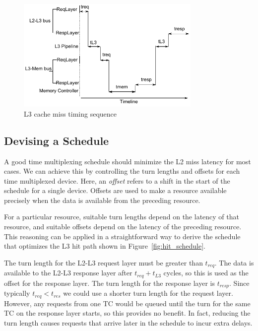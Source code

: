 \begin{figure}
    \begin{center}
        \includegraphics[width=3.5in]{figs/miss_timing.pdf}
        \caption{L3 cache miss timing sequence}
        \label{fig:miss_timing}
    \end{center}
\end{figure}

\subsection{Devising a Schedule}
A good time multiplexing schedule should minimize the L2 miss latency for most 
cases. We can achieve this by controlling the turn lengths and offsets for each 
time multiplexed device. Here, an \emph{offset} refers to a shift in the start 
of the schedule for a single device. Offsets are used to make a resource 
available precisely when the data is available from the preceding resource.


For a particular resource, suitable turn lengths depend on the latency of that 
resource, and suitable offsets depend on the latency of the preceding resource.
This reasoning can be applied in a straightforward way to derive the schedule 
that optimizes the L3 hit path shown in Figure~\ref{fig:hit_schedule}.

The turn length for the L2-L3 request layer must be greater than $t_{req}$. The 
data is available to the L2-L3 response layer after $t_{req}+t_{L3}$ cycles, so 
this is used as the offset for the response layer. The turn length for the 
response layer is $t_{resp}$. Since typically $t_{req}<t_{res}$ we could use a 
shorter turn length for the request layer. However, any requests from one TC 
would be queued until the turn for the same TC on the response layer starts, so 
this provides no benefit. In fact, reducing the turn length causes requests 
that arrive later in the schedule to incur extra delays.

